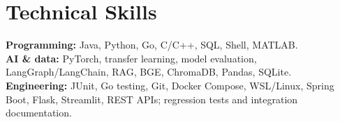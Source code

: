\documentclass[11pt,a4paper]{article}
\begin{document}
\section*{Technical Skills}
\textbf{Programming:} Java, Python, Go, C/C++, SQL, Shell, MATLAB.\\
\textbf{AI \& data:} PyTorch, transfer learning, model evaluation, LangGraph/LangChain, RAG, BGE, ChromaDB, Pandas, SQLite.\\
\textbf{Engineering:} JUnit, Go testing, Git, Docker Compose, WSL/Linux, Spring Boot, Flask, Streamlit, REST APIs; regression tests and integration documentation.
\end{document}
